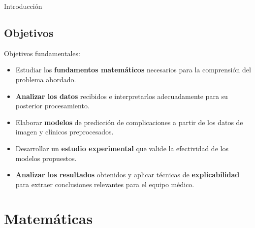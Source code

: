 \documentclass{beamer}
\begin{document}
\begin{frame}{Introducción}
{\begin{center}
\end{center}
}

\vspace{0.5em}


\end{frame}


\subsection{Objetivos}

\begin{frame}{Objetivos fundamentales:}

\begin{itemize}
    \item Estudiar los \textbf{fundamentos matemáticos} necesarios para la comprensión del problema abordado.
    \item \textbf{Analizar los datos} recibidos e interpretarlos adecuadamente para su posterior procesamiento.
    \item Elaborar \textbf{modelos} de predicción de complicaciones a partir de los datos de imagen y clínicos preprocesados.
    \item Desarrollar un \textbf{estudio experimental} que valide la efectividad de los modelos propuestos.
    \item \textbf{Analizar los resultados} obtenidos y aplicar técnicas de \textbf{explicabilidad} para extraer conclusiones relevantes para el equipo médico.
\end{itemize}

\end{frame}



\section{Matemáticas}
\end{document}
